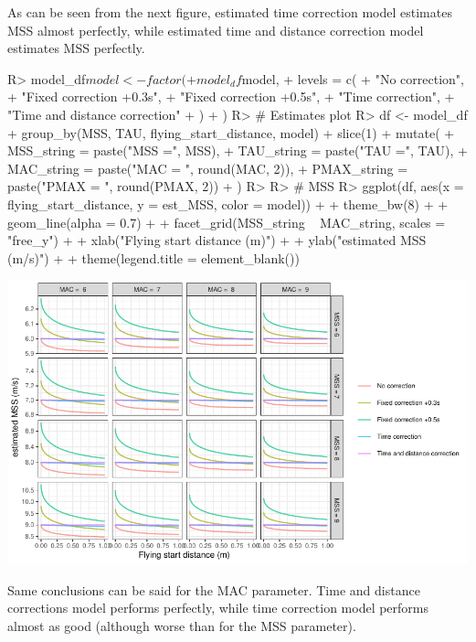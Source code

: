 \documentclass[
]{jss}
\begin{document}
As can be seen from the next figure, estimated time correction model estimates MSS almost perfectly, while estimated time and distance correction model estimates MSS perfectly.

\begin{CodeChunk}
\begin{CodeInput}
R> model_df$model <- factor(
+   model_df$model,
+   levels = c(
+     "No correction",
+     "Fixed correction +0.3s",
+     "Fixed correction +0.5s",
+     "Time correction",
+     "Time and distance correction"
+   )
+ )
R> # Estimates plot
R> df <- model_df %
+   group_by(MSS, TAU, flying_start_distance, model) %
+   slice(1) %
+   mutate(
+     MSS_string = paste("MSS =", MSS),
+     TAU_string = paste("TAU =", TAU),
+     MAC_string = paste("MAC = ", round(MAC, 2)),
+     PMAX_string = paste("PMAX = ", round(PMAX, 2))
+   )
R> 
R> # MSS
R> ggplot(df, aes(x = flying_start_distance, y = est_MSS, color = model)) +
+   theme_bw(8) +
+   geom_line(alpha = 0.7) +
+   facet_grid(MSS_string ~ MAC_string, scales = "free_y") +
+   xlab("Flying start distance (m)") +
+   ylab("estimated MSS (m/s)") +
+   theme(legend.title = element_blank())
\end{CodeInput}


\begin{center}\includegraphics[width=1\linewidth]{paper_files/figure-latex/unnamed-chunk-35-1} \end{center}

\end{CodeChunk}

Same conclusions can be said for the MAC parameter. Time and distance corrections model performs perfectly, while time correction model performs almost as good (although worse than for the MSS parameter).
\end{document}
